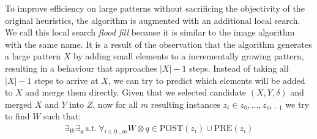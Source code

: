 \documentclass{llncs}
\begin{document}
To improve efficiency on large patterns without sacrificing the objectivity of the original heuristics, the algorithm is augmented with an additional local search. We call this local search \emph{flood fill} because it is similar to the image algorithm with the same name. It is a result of the observation that the algorithm generates a large pattern $X$ by adding small elements to a incrementally growing pattern, resulting in a behaviour that approaches $|X|-1$ steps. Instead of taking all $|X|-1$ steps to arrive at $X$, we can try to predict which elements will be added to $X$ and merge them directly. Given that we selected candidate $(X,Y,\delta)$ and merged $X$ and $Y$ into $Z$, now for all $m$ resulting instances $z_i \in {z_0,\dots,z_{m-1}}$ we try to find $W$ such that:
\begin{align}
\exists_W \exists_q \ \mathrm{s.t.} \ \forall_{i\in 0\dots m} W \otimes q \in \mathrm{POST}(z_i) \cup \mathrm{PRE}(z_i)
\end{align}







\end{document}
